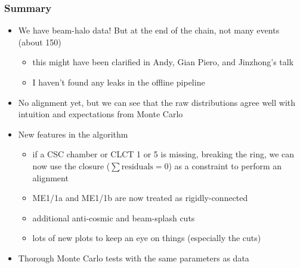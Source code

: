 \documentclass[compress]{beamer}
\begin{document}
\begin{frame}
\frametitle{Summary}
\begin{itemize}
\item We have beam-halo data!  But at the end of the chain, not many events (about 150)
\begin{itemize}
\item this might have been clarified in Andy, Gian Piero, and Jinzhong's talk
\item I haven't found any leaks in the offline pipeline
\end{itemize}

\item No alignment yet, but we can see that the raw
  distributions agree well with intuition and expectations from Monte Carlo

\item New features in the algorithm
\begin{itemize}\setlength{\itemsep}{0.1 cm}
\item if a CSC chamber or CLCT 1 or 5 is missing, breaking the ring, we can
  now use the closure ($\sum \mbox{residuals} = 0$) as a constraint to perform an alignment

\item ME1/1a and ME1/1b are now treated as rigidly-connected

\item additional anti-cosmic and beam-splash cuts

\item lots of new plots to keep an eye on things (especially the cuts)
\end{itemize}

\item Thorough Monte Carlo tests with the same parameters as data
\end{itemize}
\end{frame}
\end{document}

